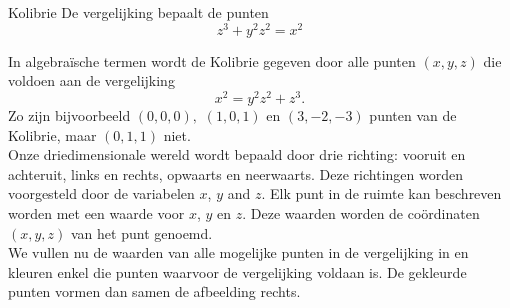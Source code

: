 \begin{surferPage}{Kolibrie}
De vergelijking bepaalt de punten\\
  
  \smallskip
\[z^3+ y^2	z^2	= x^2\]

\singlespacing
In algebra\"ische termen wordt de Kolibrie gegeven door alle punten $(x, y, z)$ die voldoen aan de vergelijking
\smallskip
\[ x^2= y^2z^2+z^3.\]
\smallskip
Zo zijn bijvoorbeeld $(0,0,0),$ $(1,0,1)$ en $(3,-2,-3)$ punten van de Kolibrie, maar $(0,1,1)$ niet.\\
 \singlespacing
Onze driedimensionale wereld wordt bepaald door drie richting: vooruit en achteruit, links en rechts, opwaarts en neerwaarts. Deze richtingen worden voorgesteld door de variabelen $x$, $y$ and $z$. Elk punt in de ruimte kan beschreven worden met een waarde voor $x$, $y$ en $z$. Deze waarden worden de co\"ordinaten $(x,y,z)$ van het punt genoemd.\\
\singlespacing
We vullen nu de waarden van alle mogelijke punten in de vergelijking in en kleuren enkel die punten waarvoor de vergelijking voldaan is. De gekleurde punten vormen dan samen de afbeelding rechts.
\end{surferPage}
